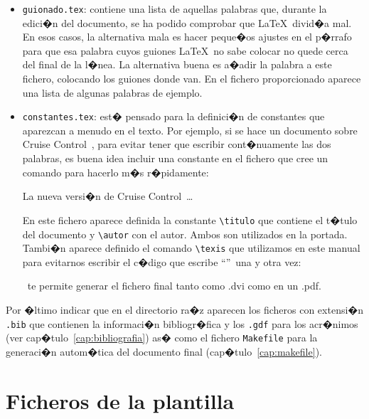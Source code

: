 \begin{itemize}
\item \texttt{guionado.tex}: contiene una lista de aquellas palabras
  que, durante la edici�n del documento, se ha podido comprobar que
  \LaTeX\ divid�a mal. En esos casos, la alternativa mala es hacer
  peque�os ajustes en el p�rrafo para que esa palabra cuyos guiones
  \LaTeX\ no sabe colocar no quede cerca del final de la l�nea. La
  alternativa buena es a�adir la palabra a este fichero, colocando los
  guiones donde van. En el fichero proporcionado aparece una lista de
  algunas palabras de ejemplo.

\item \texttt{constantes.tex}: est� pensado para la definici�n de
  constantes que aparezcan a menudo en el texto. Por ejemplo, si se
  hace un documento sobre Cruise Control~\citep{CruiseControl}, para
  evitar tener que escribir cont�nuamente las dos palabras, es buena
  idea incluir una constante en el fichero que cree un comando para
  hacerlo m�s r�pidamente:

\begin{example}
\newcommand{\cc}{Cruise Control}
La nueva versi�n de \cc\ \ldots
\end{example}

En este fichero aparece definida la constante \verb|\titulo| que
contiene el t�tulo del documento y \verb|\autor| con el autor. Ambos
son utilizados en la portada. Tambi�n aparece definido el comando
\verb|\texis| que utilizamos en este manual para evitarnos escribir el
c�digo que escribe ``\texis''\ una y otra vez:

\begin{example}
\texis\ te permite generar el
fichero final tanto como .dvi
como en un .pdf.
\end{example}
\end{itemize}

Por �ltimo indicar que en el directorio ra�z aparecen los ficheros con
extensi�n \texttt{.bib} que contienen la informaci�n bibliogr�fica y
los \texttt{.gdf} para los acr�nimos (ver
cap�tulo~\ref{cap:bibliografia}) as� como el fichero \texttt{Makefile}
para la generaci�n autom�tica del documento final
(cap�tulo~\ref{cap:makefile}).

\section{Ficheros de la plantilla}
\label{cap2:sec:ficheros-formato}

